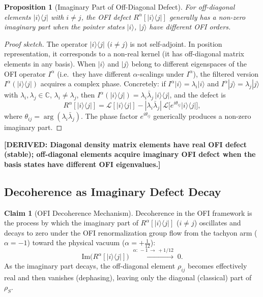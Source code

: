 \documentclass[12pt]{article}
\newtheorem{proposition}[theorem]{Proposition}
\theoremstyle{definition}
\newtheorem{claim}[theorem]{Claim}
\newcommand{\C}{\mathbb{C}}
\newcommand{\DERIVED}[1]{\textcolor{derivedcolor}{\textbf{[DERIVED: #1]}}}
\begin{document}
\begin{proposition}[Imaginary Part of Off-Diagonal Defect]
\label{prop:offdiagonal}
For off-diagonal elements $|i\rangle\langle j|$ with $i \neq j$,
the OFI defect $R^\alpha[|i\rangle\langle j|]$ generally has a
non-zero imaginary part when the pointer states $|i\rangle$, $|j\rangle$
have different OFI orders.
\end{proposition}

\begin{proof}[Proof sketch]
The operator $|i\rangle\langle j|$ ($i\neq j$) is not self-adjoint.
In position representation, it corresponds to a non-real kernel
(it has off-diagonal matrix elements in any basis).  When $|i\rangle$
and $|j\rangle$ belong to different eigenspaces of the OFI operator
$I^\alpha$ (i.e.\ they have different $\alpha$-scalings under $I^\alpha$),
the filtered version $I^\alpha(|i\rangle\langle j|)$ acquires a
complex phase.  Concretely: if $I^\alpha|i\rangle = \lambda_i|i\rangle$
and $I^\alpha|j\rangle = \lambda_j|j\rangle$ with
$\lambda_i, \lambda_j \in \C$, $\lambda_i \neq \lambda_j$, then
$I^\alpha(|i\rangle\langle j|) = \lambda_i\bar\lambda_j\, |i\rangle\langle j|$,
and the defect is
\[
  R^\alpha[|i\rangle\langle j|]
  = \mathcal{L}[|i\rangle\langle j|]
    - |\lambda_i\bar\lambda_j|\,
      \mathcal{L}\bigl[e^{i\theta_{ij}}|i\rangle\langle j|\bigr],
\]
where $\theta_{ij} = \arg(\lambda_i\bar\lambda_j)$.  The phase factor
$e^{i\theta_{ij}}$ generically produces a non-zero imaginary part.
\end{proof}

\DERIVED{Diagonal density matrix elements have real OFI defect (stable);
off-diagonal elements acquire imaginary OFI defect when the basis states
have different OFI eigenvalues.}

\subsection{Decoherence as Imaginary Defect Decay}

\begin{claim}[OFI Decoherence Mechanism]
\label{claim:decoherence}
Decoherence in the OFI framework is the process by which the imaginary
part of $R^\alpha[|i\rangle\langle j|]$ ($i\neq j$) oscillates and
decays to zero under the OFI renormalization group flow from the tachyon
arm ($\alpha = -1$) toward the physical vacuum ($\alpha = +\tfrac{1}{12}$):
\begin{equation}
  \mathrm{Im}\bigl(R^\alpha[|i\rangle\langle j|]\bigr)
  \;\xrightarrow{\alpha:\,-1\,\to\,+1/12}\;
  0.
  \label{eq:decoherence}
\end{equation}
As the imaginary part decays, the off-diagonal element $\rho_{ij}$
becomes effectively real and then vanishes (dephasing), leaving only the
diagonal (classical) part of $\rho_S$.
\end{claim}
\end{document}

